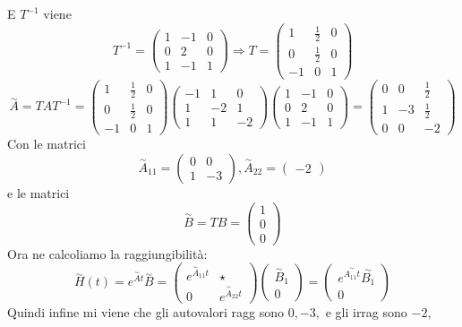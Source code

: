 \documentclass{article}
\begin{document}
E $T^{-1}$ viene \[ T^{-1} = \left(\begin{matrix}1 & -1 & 0\\0 & 2 & 0\\1 & -1 & 1\end{matrix}\right) \Longrightarrow T = \left(\begin{matrix}1 & \frac{1}{2} & 0\\0 & \frac{1}{2} & 0\\-1 & 0 & 1\end{matrix}\right) \]
\[ \overset{\sim}{A} = T A  T^{-1} = \left(\begin{matrix}1 & \frac{1}{2} & 0\\0 & \frac{1}{2} & 0\\-1 & 0 & 1\end{matrix}\right)\left(\begin{matrix}-1 & 1 & 0\\1 & -2 & 1\\1 & 1 & -2\end{matrix}\right)\left(\begin{matrix}1 & -1 & 0\\0 & 2 & 0\\1 & -1 & 1\end{matrix}\right) = \left(\begin{matrix}0 & 0 & \frac{1}{2}\\1 & -3 & \frac{1}{2}\\0 & 0 & -2\end{matrix}\right) \]Con le matrici \[ \overset{\sim}{A}_{11} = \left(\begin{matrix}0 & 0\\1 & -3\end{matrix}\right) , \overset{\sim}{A}_{22} = \left(\begin{matrix}-2\end{matrix}\right)  \]e le matrici \[ \overset{\sim}{B} = TB = \left(\begin{matrix}1\\0\\0\end{matrix}\right)  \]
Ora ne calcoliamo la raggiungibilità: \[ \overset{\sim}{H}(t) = e^{\overset{\sim}{A}t}\overset{\sim}{B} = \begin{pmatrix} e^{\overset{\sim}{A}_{11}t} &  \star \\ 0 & e^{\overset{\sim}{A}_{22}t} \end{pmatrix} \begin{pmatrix} \overset{\sim}{B}_1 \\ 0 \end{pmatrix} = \begin{pmatrix} e^{\overset{\sim}{A_{11}t}}\overset{\sim}{B_1} \\ 0 \end{pmatrix} \]
Quindi infine mi viene che gli autovalori ragg sono $ 0, -3,  $ e gli irrag sono $ -2,  $
\end{document}
